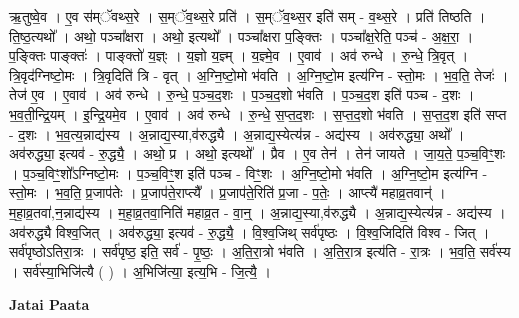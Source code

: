 \documentclass[17pt]{extarticle}
\begin{document}
ऋ॒तुष्वे॒व । ए॒व स॑म्ॅवथ्स॒रे । स॒म्ॅव॒थ्स॒रे प्रति॑ । स॒म्ॅव॒थ्स॒र इति॑ सम् - व॒थ्स॒रे । प्रति॑ तिष्ठति । ति॒ष्ठ॒त्यथो᳚ । अथो॒ पञ्चा᳚क्षरा । अथो॒ इत्यथो᳚ । पञ्चा᳚क्षरा प॒ङ्‍क्तिः । पञ्चा᳚क्ष॒रेति॒ पञ्च॑ - अ॒क्ष॒रा॒ । प॒ङ्‍क्तिः पाङ्‍क्तः॑ । पाङ्‍क्तो॑ य॒ज्ञ्ः । य॒ज्ञो य॒ज्ञ्म् । य॒ज्ञ्मे॒व । ए॒वाव॑ । अव॑ रुन्धे । रु॒न्धे॒ त्रि॒वृत् । त्रि॒वृद॑ग्निष्टो॒मः । त्रि॒वृदिति॑ त्रि - वृत् । अ॒ग्नि॒ष्टो॒मो भ॑वति । अ॒ग्नि॒ष्टो॒म इत्य॑ग्नि - स्तो॒मः । भ॒व॒ति॒ तेजः॑ । तेज॑ ए॒व । ए॒वाव॑ । अव॑ रुन्धे । रु॒न्धे॒ प॒ञ्च॒द॒शः । प॒ञ्च॒द॒शो भ॑वति । प॒ञ्च॒द॒श इति॑ पञ्च - द॒शः । भ॒व॒ती॒न्द्रि॒यम् । इ॒न्द्रि॒यमे॒व । ए॒वाव॑ । अव॑ रुन्धे । रु॒न्धे॒ स॒प्त॒द॒शः । स॒प्त॒द॒शो भ॑वति । स॒प्त॒द॒श इति॑ सप्त - द॒शः । भ॒व॒त्य॒न्नाद्य॑स्य । अ॒न्नाद्य॒स्या,व॑रुद्ध्यै । अ॒न्नाद्य॒स्येत्य॑न्न - अद्य॑स्य । अव॑रुद्ध्या॒ अथो᳚ । अव॑रुद्ध्या॒ इत्यव॑ - रु॒द्ध्यै॒ । अथो॒ प्र । अथो॒ इत्यथो᳚ । प्रैव । ए॒व तेन॑ । तेन॑ जायते । जा॒य॒ते॒ प॒ञ्च॒विꣳ॒॒शः । प॒ञ्च॒विꣳ॒॒शो᳚ऽग्निष्टो॒मः । प॒ञ्च॒विꣳ॒॒श इति॑ पञ्च - विꣳ॒॒शः । अ॒ग्नि॒ष्टो॒मो भ॑वति । अ॒ग्नि॒ष्टो॒म इत्य॑ग्नि - स्तो॒मः । भ॒व॒ति॒ प्र॒जाप॑तेः । प्र॒जाप॑ते॒राप्त्यै᳚ । प्र॒जाप॑ते॒रिति॑ प्र॒जा - प॒तेः॒ । आप्त्यै॑ महाव्र॒तवान्॑ । म॒हा॒व्र॒तवा॑,न॒न्नाद्य॑स्य । म॒हा॒व्र॒तवा॒निति॑ महाव्र॒त - वा॒न्॒ । अ॒न्नाद्य॒स्या,व॑रुद्ध्यै । अ॒न्नाद्य॒स्येत्य॑न्न - अद्य॑स्य । अव॑रुद्ध्यै विश्व॒जित् । अव॑रुद्ध्या॒ इत्यव॑ - रु॒द्ध्यै॒ । वि॒श्व॒जिथ् सर्व॑पृष्ठः । वि॒श्व॒जिदिति॑ विश्व - जित् । सर्व॑पृष्ठोऽतिरा॒त्रः । सर्व॑पृष्ठ॒ इति॒ सर्व॑ - पृ॒ष्ठः॒ । अ॒ति॒रा॒त्रो भ॑वति । अ॒ति॒रा॒त्र इत्य॑ति - रा॒त्रः । भ॒व॒ति॒ सर्व॑स्य । सर्व॑स्या॒भिजि॑त्यै ( ) । अ॒भिजि॑त्या॒ इत्य॒भि - जि॒त्यै॒ । \newline

\textbf{Jatai Paata} \newline
\end{document}
